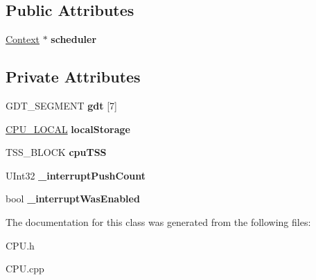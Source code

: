 \subsection*{Public Attributes}
\begin{DoxyCompactItemize}
\item 
\mbox{\label{class_c_p_u_a15e6683421a83407a0d3173fbcaf8c3a}} 
\hyperlink{class_c_p_u_1_1_context}{Context} $\ast$ {\bfseries scheduler}
\end{DoxyCompactItemize}
\subsection*{Private Attributes}
\begin{DoxyCompactItemize}
\item 
\mbox{\label{class_c_p_u_a06414fdfbd4dccc052cb325816732e36}} 
G\+D\+T\+\_\+\+S\+E\+G\+M\+E\+NT {\bfseries gdt} \mbox{[}7\mbox{]}
\item 
\mbox{\label{class_c_p_u_a06011b73c6a1da6fc859dc2e1f011364}} 
\hyperlink{struct_c_p_u_1_1_c_p_u___l_o_c_a_l}{C\+P\+U\+\_\+\+L\+O\+C\+AL} {\bfseries local\+Storage}
\item 
\mbox{\label{class_c_p_u_a26a747f5fdf4e7748d1422a5cb4b992b}} 
T\+S\+S\+\_\+\+B\+L\+O\+CK {\bfseries cpu\+T\+SS}
\item 
\mbox{\label{class_c_p_u_ab5cf734b3b2a0d35f6e1ae0eb858863f}} 
U\+Int32 {\bfseries \+\_\+interrupt\+Push\+Count}
\item 
\mbox{\label{class_c_p_u_a58492e700fe3f7f06ea10e510803c34f}} 
bool {\bfseries \+\_\+interrupt\+Was\+Enabled}
\end{DoxyCompactItemize}


The documentation for this class was generated from the following files\+:\begin{DoxyCompactItemize}
\item 
C\+P\+U.\+h\item 
C\+P\+U.\+cpp\end{DoxyCompactItemize}
